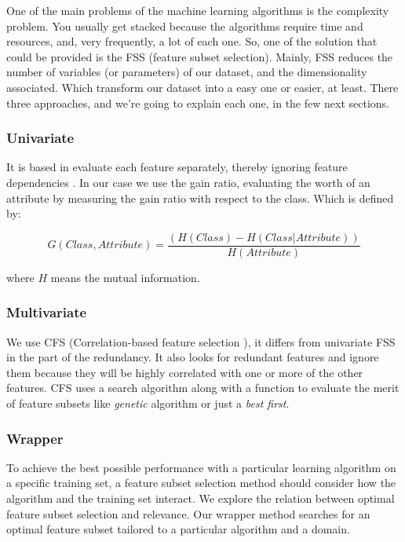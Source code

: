 \documentclass[conference,a4paper]{IEEEtran}
\begin{document}
One of the main problems of the machine learning algorithms is the complexity problem. You usually get stacked because the algorithms require time and resources, and, very frequently, a lot of each one. So, one of the solution that could be provided is the FSS (feature subset selection). Mainly, FSS reduces the number of variables (or parameters) of our dataset, and the dimensionality associated. Which transform our dataset into a easy one or easier, at least. There three approaches, and we're going to explain each one, in the few next sections.

\subsubsection{Univariate}

It is based in evaluate each feature separately, thereby ignoring feature dependencies \cite{Univariate}. In our case we use the gain ratio, evaluating the worth of an attribute by measuring the gain ratio with respect to the class. Which is defined by:

\begin{equation}
	G(Class, Attribute) = \frac{(H(Class) - H(Class | Attribute))}{H(Attribute)}
\end{equation}

where $H$ means the mutual information.

\subsubsection{Multivariate}

We use CFS (Correlation-based feature selection \cite{CFS}), it differs from univariate FSS in the part of the redundancy. It also looks for redundant features and ignore them because they will be highly correlated with one or more of the other features. CFS uses a search algorithm along with a function to evaluate the merit of feature subsets like \emph{genetic} algorithm or just a \emph{best first}.

\subsubsection{Wrapper \cite{Wrapper}}

To achieve the best possible performance with a particular learning algorithm on a specific training set, a feature subset selection method should consider how the algorithm and the training set interact. We explore the relation between optimal feature subset selection and relevance. Our wrapper method searches for an optimal feature subset tailored to a particular algorithm and a domain. 
\end{document}
